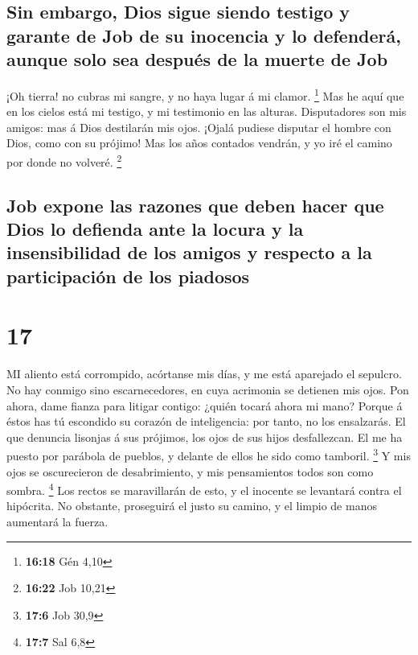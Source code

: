\hypertarget{sin-embargo-dios-sigue-siendo-testigo-y-garante-de-job-de-su-inocencia-y-lo-defenderuxe1-aunque-solo-sea-despuuxe9s-de-la-muerte-de-job}{%
\subsection{Sin embargo, Dios sigue siendo testigo y garante de Job de
su inocencia y lo defenderá, aunque solo sea después de la muerte de
Job}\label{sin-embargo-dios-sigue-siendo-testigo-y-garante-de-job-de-su-inocencia-y-lo-defenderuxe1-aunque-solo-sea-despuuxe9s-de-la-muerte-de-job}}

 ¡Oh tierra! no cubras mi sangre, y no haya lugar á mi
clamor. \footnote{\textbf{16:18} Gén 4,10}  Mas he aquí
que en los cielos está mi testigo, y mi testimonio en las alturas.
 Disputadores son mis amigos: mas á Dios destilarán mis
ojos.  ¡Ojalá pudiese disputar el hombre con Dios, como
con su prójimo!  Mas los años contados vendrán, y yo iré
el camino por donde no volveré. \footnote{\textbf{16:22} Job 10,21}

\hypertarget{job-expone-las-razones-que-deben-hacer-que-dios-lo-defienda-ante-la-locura-y-la-insensibilidad-de-los-amigos-y-respecto-a-la-participaciuxf3n-de-los-piadosos}{%
\subsection{Job expone las razones que deben hacer que Dios lo defienda
ante la locura y la insensibilidad de los amigos y respecto a la
participación de los
piadosos}\label{job-expone-las-razones-que-deben-hacer-que-dios-lo-defienda-ante-la-locura-y-la-insensibilidad-de-los-amigos-y-respecto-a-la-participaciuxf3n-de-los-piadosos}}

\hypertarget{section-16}{%
\section{17}\label{section-16}}

 MI aliento está corrompido, acórtanse mis días, y me está
aparejado el sepulcro.  No hay conmigo sino
escarnecedores, en cuya acrimonia se detienen mis ojos. 
Pon ahora, dame fianza para litigar contigo: ¿quién tocará ahora mi
mano?  Porque á éstos has tú escondido su corazón de
inteligencia: por tanto, no los ensalzarás.  El que
denuncia lisonjas á sus prójimos, los ojos de sus hijos desfallezcan.
 El me ha puesto por parábola de pueblos, y delante de
ellos he sido como tamboril. \footnote{\textbf{17:6} Job 30,9}
 Y mis ojos se oscurecieron de desabrimiento, y mis
pensamientos todos son como sombra. \footnote{\textbf{17:7} Sal 6,8}
 Los rectos se maravillarán de esto, y el inocente se
levantará contra el hipócrita.  No obstante, proseguirá el
justo su camino, y el limpio de manos aumentará la fuerza.

